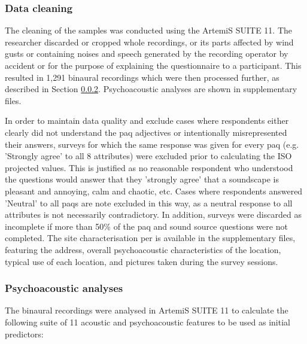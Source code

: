 
   \subsubsection{Data cleaning}
   The cleaning of the samples was conducted using the ArtemiS SUITE 11. The researcher discarded or cropped whole recordings, or its parts affected by wind gusts or containing noises and speech generated by the recording operator by accident or for the purpose of explaining the questionnaire to a participant. This resulted in 1,291 binaural recordings which were then processed further, as described in Section \ref{sec:analyses}. Psychoacoustic analyses are shown in supplementary files.

   In order to maintain data quality and exclude cases where respondents either clearly did not understand the \gls{paq} adjectives or intentionally misrepresented their answers, surveys for which the same response was given for every \gls{paq} (e.g. 'Strongly agree' to all 8 attributes) were excluded prior to calculating the ISO projected values. This is justified as no reasonable respondent who understood the questions would answer that they 'strongly agree' that a soundscape is pleasant and annoying, calm and chaotic, etc. Cases where respondents answered 'Neutral' to all \gls{paq}s are note excluded in this way, as a neutral response to all attributes is not necessarily contradictory. In addition, surveys were discarded as incomplete if more than 50\% of the \gls{paq} and sound source questions were not completed.
   The site characterisation per \citet{ISO12913_2_2018IOS} is available in the supplementary files, featuring the address, overall psychoacoustic characteristics of the location, typical use of each location, and pictures taken during the survey sessions.

   \subsubsection{Psychoacoustic analyses}
   \label{sec:analyses}
   The binaural recordings were analysed in ArtemiS SUITE 11 to calculate the following suite of 11 acoustic and psychoacoustic features to be used as initial predictors:

